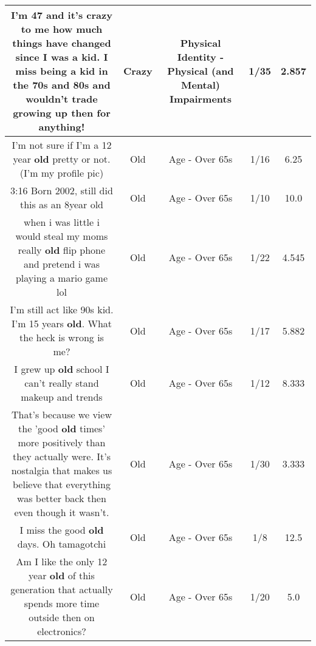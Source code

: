 \documentclass[11pt]{article}
\newlength\mylength
\begin{document}
\begin{center}
\begin{longtable}{|C{.65\mylength}|C{.30\mylength}|C{.12\mylength}|C{.12\mylength}|C{.12\mylength}|}
  \small I'm 47 and it's \textbf{crazy} to me how much things have changed since I was a kid. I miss being a kid in the 70s and 80s and wouldn't trade growing up then for anything!\normalsize   & Crazy & Physical Identity - Physical (and Mental) Impairments & 1/35 & 2.857 \\  \hline
  \small I'm not sure if I'm a 12 year \textbf{old} pretty or not. (I'm my profile pic)\normalsize   & Old & Age - Over 65s & 1/16 & 6.25 \\  \hline
  \small 3:16 Born 2002, still did this as an 8year old\normalsize   & Old & Age - Over 65s & 1/10 & 10.0 \\  \hline
  \small when i was little i would steal my moms really \textbf{old} flip phone and pretend i was playing a mario game lol\normalsize   & Old & Age - Over 65s & 1/22 & 4.545 \\  \hline
  \small I'm still act like 90s kid. I'm 15 years \textbf{old}. What the heck is wrong is me?\normalsize   & Old & Age - Over 65s & 1/17 & 5.882 \\  \hline
  \small I grew up \textbf{old} school I can't really stand makeup and trends\normalsize   & Old & Age - Over 65s & 1/12 & 8.333 \\  \hline
  \small That's because we view the 'good \textbf{old} times' more positively than they actually were. It's nostalgia that makes us believe that everything was better back then even though it wasn't.\normalsize   & Old & Age - Over 65s & 1/30 & 3.333 \\  \hline
  \small I miss the good \textbf{old} days. Oh tamagotchi\normalsize   & Old & Age - Over 65s & 1/8 & 12.5 \\  \hline
  \small Am I like the only 12 year \textbf{old} of this generation that actually spends more time outside then on electronics?\normalsize   & Old & Age - Over 65s & 1/20 & 5.0 \\  \hline

\end{longtable}
\end{center}
\end{document}
